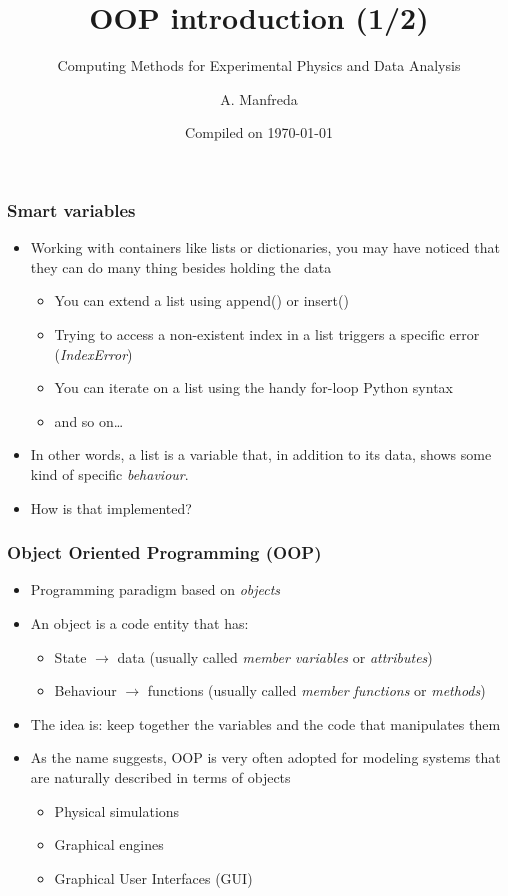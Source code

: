 \documentclass[9pt]{beamer}
\title{OOP introduction (1/2)}
\subtitle{Computing Methods for Experimental Physics and Data Analysis}
\date{Compiled on \today}
\author{A. Manfreda}
\institute[INFN]{INFN--Pisa}
\begin{document}
\titleframe


\begin{frame}
  \frametitle{Smart variables}
  
  \begin{itemize}
    \item Working with containers like lists or dictionaries, you may have noticed
          that they can do many thing besides holding the data
    \medskip
    \begin{itemize}
      \item You can extend a list using append() or insert()
      \item Trying to access a non-existent index in a list triggers a specific error (\emph{IndexError})
      \item You can iterate on a list using the handy for-loop Python syntax
      \item and so on\dots
     \end{itemize}
     \medskip
     \item In other words, a list is a variable that, in addition to its data,
           shows some kind of specific \emph{behaviour}.
     \medskip
     \item How is that implemented?
  \end{itemize}
\end{frame}



\begin{frame}
  \frametitle{Object Oriented Programming (OOP)}
  
  \begin{itemize}
    \small
    \item Programming paradigm based on \emph{objects}
    \bigskip
    \item An object is a code entity that has:
    \smallskip
    \begin{itemize}
      \item \alert{State} $\rightarrow$ data (usually called \emph{member variables} or \emph{attributes})
      \smallskip
      \item \alert{Behaviour} $\rightarrow$ functions (usually called \emph{member functions} or \emph{methods})
    \end{itemize}
    \bigskip
    \item The idea is: keep together the variables and the code that manipulates them
    \bigskip
    \item As the name suggests, OOP is very often adopted for modeling systems that are naturally
          described in terms of objects  
    \begin{itemize}
      \smallskip
      \item Physical simulations
      \smallskip
      \item Graphical engines
      \smallskip
      \item Graphical User Interfaces (GUI) 
    \end{itemize}

  \end{itemize}
\end{frame}
\end{document}
